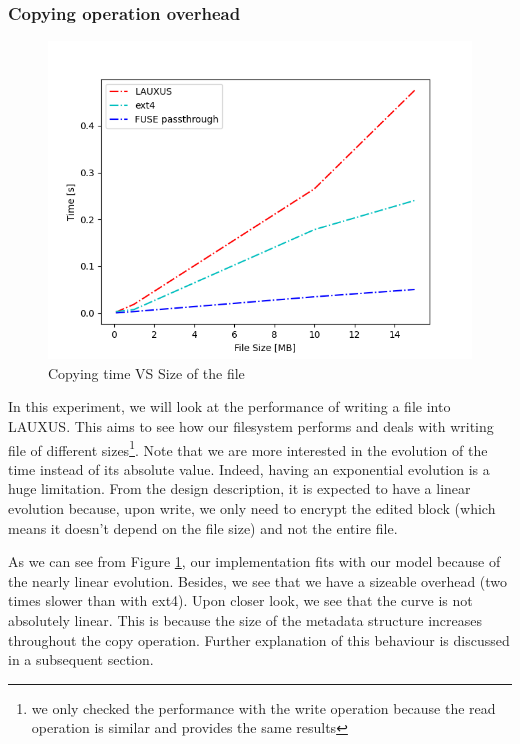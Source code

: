 \documentclass[../main.tex]{subfiles}
\begin{document}
\subsubsection{Copying operation overhead}
\label{section:analysis:write_overhead}
\begin{figure}[h]
    \centering
    \includegraphics[width=.8\textwidth]{images/analysis/per_size}
    
    \caption{Copying time VS Size of the file}
    \label{figure:analysis:perf_write_per_size}
\end{figure}
\par In this experiment, we will look at the performance of writing a file into LAUXUS. This aims to see how our filesystem performs and deals with writing file of different sizes\footnote{we only checked the performance with the write operation because the read operation is similar and provides the same results}. Note that we are more interested in the evolution of the time instead of its absolute value. Indeed, having an exponential evolution is a huge limitation. From the design description, it is expected to have a linear evolution because, upon write, we only need to encrypt the edited block (which means it doesn't depend on the file size) and not the entire file.
\par As we can see from Figure \ref{figure:analysis:perf_write_per_size}, our implementation fits with our model because of the nearly linear evolution. Besides, we see that we have a sizeable overhead (two times slower than with ext4). Upon closer look, we see that the curve is not absolutely linear. This is because the size of the metadata structure increases throughout the copy operation. Further explanation of this behaviour is discussed in a subsequent section.
\end{document}
